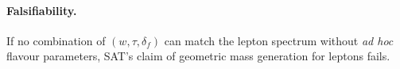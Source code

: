 \paragraph{Falsifiability.}
If no combination of $(w,\tau,\delta_f)$ can match the lepton spectrum
without \emph{ad hoc} flavour parameters, SAT’s claim of geometric mass
generation for leptons fails.


